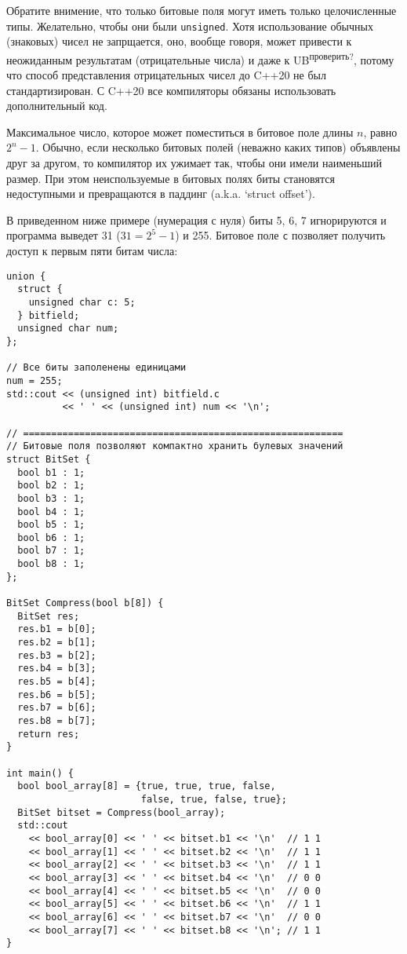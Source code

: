 Обратите внимение, что только битовые поля могут иметь только целочисленные типы.
{\small Желательно, чтобы они были \verb|unsigned|. Хотя использование обычных (знаковых)
чисел не запрщается, оно, вообще говоря, может привести к неожиданным результатам (отрицательные числа) и даже к UB\textsuperscript{проверить?},
потому что способ представления отрицательных чисел до C++20 не был стандартизирован.
С C++20 все компиляторы обязаны использовать дополнительный код.}

Максимальное число, которое может поместиться в битовое поле длины $n$, равно $2^n - 1$.
Обычно, если несколько битовых полей (неважно каких типов) объявлены друг за другом, то
компилятор их ужимает так, чтобы они имели наименьший размер. При этом неиспользуемые в
битовых полях биты становятся недоступными и превращаются в паддинг (a.k.a. `struct offset').

В приведенном ниже примере (нумерация с нуля) биты 5, 6, 7 игнорируются и программа
выведет 31 ($31 = 2^5 - 1$) и 255. Битовое поле \verb|c| позволяет получить доступ к первым пяти битам числа:
\begin{verbatim}
union {
  struct {
    unsigned char c: 5;
  } bitfield;
  unsigned char num;
};

// Все биты заполенены единицами
num = 255;
std::cout << (unsigned int) bitfield.c
          << ' ' << (unsigned int) num << '\n';

// =========================================================
// Битовые поля позволяют компактно хранить булевых значений
struct BitSet {
  bool b1 : 1;
  bool b2 : 1;
  bool b3 : 1;
  bool b4 : 1;
  bool b5 : 1;
  bool b6 : 1;
  bool b7 : 1;
  bool b8 : 1;
};

BitSet Compress(bool b[8]) {
  BitSet res;
  res.b1 = b[0];
  res.b2 = b[1];
  res.b3 = b[2];
  res.b4 = b[3];
  res.b5 = b[4];
  res.b6 = b[5];
  res.b7 = b[6];
  res.b8 = b[7];
  return res;
}
  
int main() {
  bool bool_array[8] = {true, true, true, false,
                        false, true, false, true};
  BitSet bitset = Compress(bool_array);
  std::cout
    << bool_array[0] << ' ' << bitset.b1 << '\n'  // 1 1
    << bool_array[1] << ' ' << bitset.b2 << '\n'  // 1 1
    << bool_array[2] << ' ' << bitset.b3 << '\n'  // 1 1
    << bool_array[3] << ' ' << bitset.b4 << '\n'  // 0 0
    << bool_array[4] << ' ' << bitset.b5 << '\n'  // 0 0
    << bool_array[5] << ' ' << bitset.b6 << '\n'  // 1 1
    << bool_array[6] << ' ' << bitset.b7 << '\n'  // 0 0
    << bool_array[7] << ' ' << bitset.b8 << '\n'; // 1 1
}
\end{verbatim}

